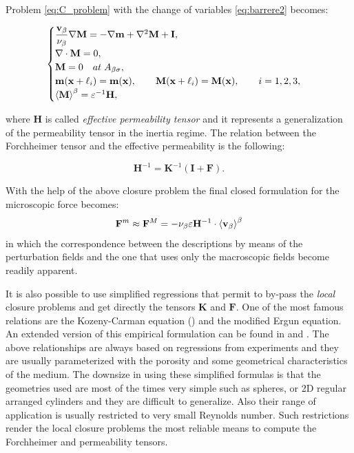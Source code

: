\newpage 
\noindent Problem \eqref{eq:C_problem} with the change of variables \eqref{eq:barrere2} becomes:

\begin{eqnarray}
	\begin{cases}
		\dfrac{\textbf{v}_{\beta}}{\nu_{\beta}} \nabla \mathbf{M} = -\nabla \mathbf{m} + \nabla^2 \mathbf{M} +\mathbf{I},\\
		\nabla \cdot \mathbf{M} = 0,  \\
		\mathbf{M} = 0 \quad at \; A_{\beta \sigma}, \\
		\mathbf{m}(\mathbf{x} +\ell_i) = \mathbf{m}(\mathbf{x}), \qquad \mathbf{M}(\mathbf{x} +\ell_i) = \mathbf{M}(\mathbf{x}), \qquad i=1,2,3 ,\\
		{\left< \mathbf{M} \right>}^{\beta} = \varepsilon^{-1} \mathbf{H},
	\end{cases}
\label{eq:M_problem}
\end{eqnarray}

\noindent where $\mathbf{H}$ is called \textit{effective permeability tensor} and it represents a generalization of the permeability tensor in the inertia regime.
The relation between the Forchheimer tensor and the effective permeability is the following:

$$
\mathbf{H}^{-1} = \mathbf{K}^{-1} \left(\mathbf{I} +\mathbf{F}\right).
$$

With the help of the above closure problem the final closed formulation for the microscopic force becomes:
\begin{equation}
\mathbf{F}^m \approx \mathbf{F}^M = - \nu_{\beta} \varepsilon \mathbf{H}^{-1} \cdot {\left< \textbf{v}_{\beta}\right>}^{\beta}
\label{eq:closure_final}
\end{equation}
in which the correspondence between the descriptions by means of the perturbation fields and the one that uses only the macroscopic fields become readily apparent.

It is also possible to use simplified regressions that permit to by-pass the \textit{local} closure problems and get directly the tensors $\mathbf{K}$ and $\mathbf{F}$.
One of the most famous relations are the Kozeny-Carman equation (\citet{kozeny}) and the modified Ergun equation.
An extended version of this empirical formulation can be found in \citet{zampogna2016fluid} and \citet{yazdchi2012towards}.
The above relationships are always based on regressions from experiments and they are usually parameterized with the porosity and some geometrical characteristics of the medium. The downsize in using these simplified formulas is that the geometries used are most of the times very simple such as spheres, or 2D regular arranged cylinders and they are difficult to generalize. Also their range of application is usually restricted to very small Reynolds number. Such restrictions render the local closure problems the most reliable means to compute the Forchheimer and permeability tensors.

